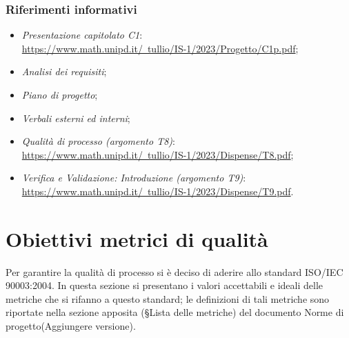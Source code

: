     \subsubsection{Riferimenti informativi}
    \begin{itemize}
    \item \textit{Presentazione capitolato C1}: \\
    \href{https://www.math.unipd.it/~tullio/IS-1/2023/Progetto/C1p.pdf}{https://www.math.unipd.it/~tullio/IS-1/2023/Progetto/C1p.pdf};
    \item \textit{Analisi dei requisiti};
    \item \textit{Piano di progetto};
    \item \textit{Verbali esterni ed interni};
    \item \textit{Qualità di processo (argomento T8)}: \\
    \href{https://www.math.unipd.it/~tullio/IS-1/2023/Dispense/T8.pdf}{https://www.math.unipd.it/~tullio/IS-1/2023/Dispense/T8.pdf};
    \item \textit{Verifica e Validazione: Introduzione (argomento T9)}: \\
    \href{https://www.math.unipd.it/~tullio/IS-1/2023/Dispense/T9.pdf}{https://www.math.unipd.it/~tullio/IS-1/2023/Dispense/T9.pdf}.
    
   
    \end{itemize}

    
\newpage
\section{Obiettivi metrici di qualità}
\label{ObiettiviQualità}
Per garantire la qualità di processo si è deciso di aderire allo standard ISO/IEC 90003:2004. In questa sezione si presentano i valori accettabili e ideali delle metriche che si rifanno a questo standard; le definizioni di tali metriche sono riportate nella sezione apposita (\S Lista delle metriche) del documento Norme di progetto(\color{red}Aggiungere versione\color{black}).
